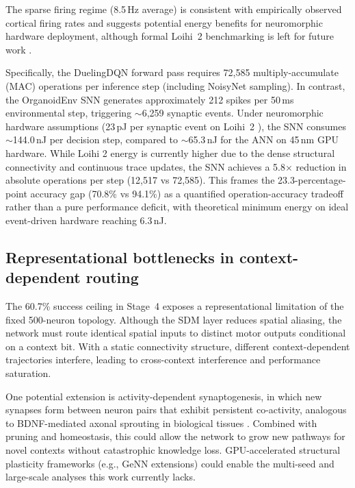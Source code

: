 \documentclass[journal,twocolumn]{IEEEtran}
\begin{document}
The sparse firing regime (8.5\,Hz average) is consistent with
empirically observed cortical firing rates and suggests potential
energy benefits for neuromorphic hardware deployment, although formal
Loihi~2 benchmarking is left for future work \cite{Davies2024Loihi}.

Specifically, the DuelingDQN forward pass requires 72,585 multiply-accumulate 
(MAC) operations per inference step (including NoisyNet sampling). In contrast, 
the OrganoidEnv SNN generates approximately 212 spikes per 50\,ms environmental 
step, triggering $\sim$6,259 synaptic events. Under neuromorphic hardware 
assumptions (23\,pJ per synaptic event on Loihi~2 \cite{Davies2024Loihi}), the 
SNN consumes $\sim$144.0\,nJ per decision step, compared to $\sim$65.3\,nJ for 
the ANN on 45\,nm GPU hardware. While Loihi 2 energy is currently higher due to 
the dense structural connectivity and continuous trace updates, the SNN achieves 
a 5.8$\times$ reduction in absolute operations per step (12,517 vs 72,585). 
This frames the 23.3-percentage-point accuracy gap (70.8\% vs 94.1\%) as a 
quantified operation-accuracy tradeoff rather than a pure performance deficit,
with theoretical minimum energy on ideal event-driven hardware reaching 6.3\,nJ.

\subsection{Representational bottlenecks in context-dependent
routing}\label{sec:bottleneck}

The 60.7\% success ceiling in Stage~4 exposes a representational
limitation of the fixed 500-neuron topology.  Although the SDM layer
reduces spatial aliasing, the network must route identical spatial
inputs to distinct motor outputs conditional on a context bit.  With
a static connectivity structure, different context-dependent
trajectories interfere, leading to cross-context interference and
performance saturation.

One potential extension is activity-dependent synaptogenesis, in which
new synapses form between neuron pairs that exhibit persistent
co-activity, analogous to BDNF-mediated axonal sprouting in biological
tissues \cite{eLifeHomeostatic2025}.  Combined with pruning and
homeostasis, this could allow the network to grow new pathways for
novel contexts without catastrophic knowledge loss.  GPU-accelerated
structural plasticity frameworks (e.g., GeNN extensions) could enable
the multi-seed and large-scale analyses this work currently lacks.
\end{document}
